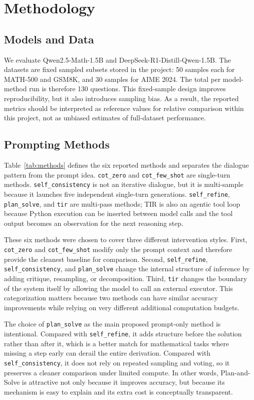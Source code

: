 \documentclass[conference]{IEEEtran}
\newcommand{\qwen}{Qwen2.5-Math-1.5B}
\newcommand{\deepseek}{DeepSeek-R1-Distill-Qwen-1.5B}
\newcommand{\mathfive}{MATH-500}
\begin{document}
\section{Methodology}
\subsection{Models and Data}
We evaluate \qwen{} and \deepseek{}. The datasets are fixed sampled subsets stored in the project: 50 samples each for \mathfive{} and GSM8K, and 30 samples for AIME 2024. The total per model-method run is therefore 130 questions. This fixed-sample design improves reproducibility, but it also introduces sampling bias. As a result, the reported metrics should be interpreted as reference values for relative comparison within this project, not as unbiased estimates of full-dataset performance.

\subsection{Prompting Methods}
Table~\ref{tab:methods} defines the six reported methods and separates the dialogue pattern from the prompt idea. \texttt{cot\_zero} and \texttt{cot\_few\_shot} are single-turn methods. \texttt{self\_consistency} is not an iterative dialogue, but it is multi-sample because it launches five independent single-turn generations. \texttt{self\_refine}, \texttt{plan\_solve}, and \texttt{tir} are multi-pass methods; TIR is also an agentic tool loop because Python execution can be inserted between model calls and the tool output becomes an observation for the next reasoning step.

These six methods were chosen to cover three different intervention styles. First, \texttt{cot\_zero} and \texttt{cot\_few\_shot} modify only the prompt context and therefore provide the cleanest baseline for comparison. Second, \texttt{self\_refine}, \texttt{self\_consistency}, and \texttt{plan\_solve} change the internal structure of inference by adding critique, resampling, or decomposition. Third, \texttt{tir} changes the boundary of the system itself by allowing the model to call an external executor. This categorization matters because two methods can have similar accuracy improvements while relying on very different additional computation budgets.

The choice of \texttt{plan\_solve} as the main proposed prompt-only method is intentional. Compared with \texttt{self\_refine}, it adds structure before the solution rather than after it, which is a better match for mathematical tasks where missing a step early can derail the entire derivation. Compared with \texttt{self\_consistency}, it does not rely on repeated sampling and voting, so it preserves a cleaner comparison under limited compute. In other words, Plan-and-Solve is attractive not only because it improves accuracy, but because its mechanism is easy to explain and its extra cost is conceptually transparent.
\end{document}
